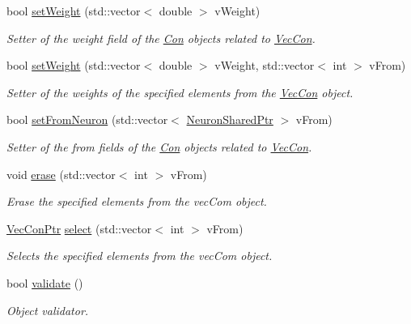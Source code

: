 \begin{DoxyCompactItemize}
bool \hyperlink{classvec_con_aed79ead4c7a01a8e34e5ed69da74e877}{setWeight} (std::vector$<$ double $>$ vWeight)
\begin{DoxyCompactList}\small\item\em Setter of the weight field of the \hyperlink{class_con}{Con} objects related to \hyperlink{classvec_con}{VecCon}. \end{DoxyCompactList}\item 
bool \hyperlink{classvec_con_a89a39247b0188b4fcc473c430ad46d4c}{setWeight} (std::vector$<$ double $>$ vWeight, std::vector$<$ int $>$ vFrom)
\begin{DoxyCompactList}\small\item\em Setter of the weights of the specified elements from the \hyperlink{classvec_con}{VecCon} object. \end{DoxyCompactList}\item 
bool \hyperlink{classvec_con_aa5ab6f399819f3a4ac0ba85adc1eb8d2}{setFromNeuron} (std::vector$<$ \hyperlink{_a_m_o_r_e_8h_a03051950b0faf9499d14cf376e04c329}{NeuronSharedPtr} $>$ vFrom)
\begin{DoxyCompactList}\small\item\em Setter of the from fields of the \hyperlink{class_con}{Con} objects related to \hyperlink{classvec_con}{VecCon}. \end{DoxyCompactList}\item 
void \hyperlink{classvec_con_aa9cc2fde90ddf466e820f929ead4fb0b}{erase} (std::vector$<$ int $>$ vFrom)
\begin{DoxyCompactList}\small\item\em Erase the specified elements from the vecCom object. \end{DoxyCompactList}\item 
\hyperlink{_a_m_o_r_e_8h_a16f0806a3e5478c590c5b8ac41187e57}{VecConPtr} \hyperlink{classvec_con_a19b101dd0dcd24587a393a1eaa80dad0}{select} (std::vector$<$ int $>$ vFrom)
\begin{DoxyCompactList}\small\item\em Selects the specified elements from the vecCom object. \end{DoxyCompactList}\item 
bool \hyperlink{classvec_con_a7dc281e7258bf8be19a1591501c5434d}{validate} ()
\begin{DoxyCompactList}\small\item\em Object validator. \end{DoxyCompactList}\end{DoxyCompactItemize}



